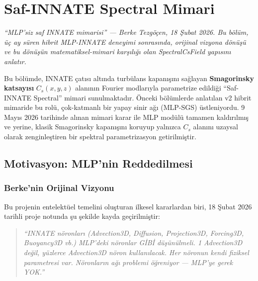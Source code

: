 \chapter{Saf-INNATE Spectral Mimari}
\label{ch:spectral}

\textit{``MLP'siz saf INNATE mimarisi'' — Berke Tezgöçen, 18 Şubat 2026.
Bu bölüm, üç ay süren hibrit MLP-INNATE deneyimi sonrasında, orijinal vizyona dönüşü
ve bu dönüşün matematiksel-mimari karşılığı olan SpectralCsField yapısını anlatır.}

\bigskip

Bu bölümde, INNATE çatısı altında turbülans kapanışını sağlayan
\textbf{Smagorinsky katsayısı} $C_s(x,y,z)$ alanının Fourier modlarıyla
parametrize edildiği ``Saf-INNATE Spectral'' mimari sunulmaktadır.
Önceki bölümlerde anlatılan v2 hibrit mimaride bu rolü, çok-katmanlı bir
yapay sinir ağı (MLP-SGS) üstleniyordu. 9 Mayıs 2026 tarihinde alınan
mimari karar ile MLP modülü tamamen kaldırılmış ve yerine, klasik
Smagorinsky kapanışını koruyup yalnızca $C_s$ alanını uzaysal olarak
zenginleştiren bir spektral parametrizasyon getirilmiştir.

\section{Motivasyon: MLP'nin Reddedilmesi}
\label{sec:motivasyon-mlp-red}

\subsection{Berke'nin Orijinal Vizyonu}

Bu projenin entelektüel temelini oluşturan ilkesel kararlardan biri, 18
Şubat 2026 tarihli proje notunda şu şekilde kayda geçirilmiştir:

\begin{quote}
\textit{``INNATE nöronları (Advection3D, Diffusion, Projection3D, Forcing3D,
Buoyancy3D vb.) MLP'deki nöronlar GİBİ düşünülmeli. 1 Advection3D değil,
yüzlerce Advection3D nöron kullanılacak. Her nöronun kendi fiziksel
parametresi var. Nöronların ağı problemi öğreniyor — MLP'ye gerek YOK.''}
\end{quote}

